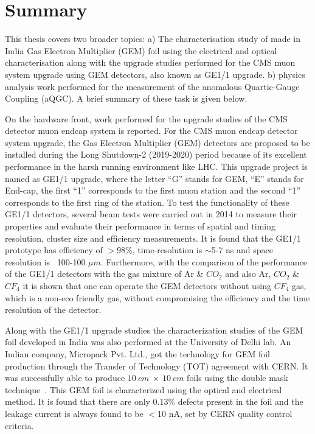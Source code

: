 \chapter{Summary} %
\label{cha:summary_&_outlook}
This thesis covers two broader topics: a) The characterisation study of made in India Gas Electron Multiplier (GEM) foil using the electrical and optical characterisation along with the upgrade studies performed for the CMS muon system upgrade using GEM detectors, also known as GE1/1 upgrade. b) physics analysis work performed for the measurement of the anomalous Quartic-Gauge Coupling (aQGC). A brief summary of these task is given below.

On the hardware front, work performed for the upgrade studies of the CMS detector muon endcap system is reported. For the CMS muon endcap detector system upgrade, the Gas Electron Multiplier (GEM) detectors are proposed to be installed during the Long Shutdown-2 (2019-2020) period because of its excellent performance in the harsh running environment like LHC. This upgrade project is named as GE1/1 upgrade, where the letter ``G'' stands for GEM, ``E'' stands for End-cap, the first ``1'' corresponds to the first muon station and the second ``1'' corresponds to the first ring of the station. To test the functionality of these GE1/1 detectors, several beam tests were carried out in 2014 to measure their properties and evaluate their performance in terms of spatial and timing resolution, cluster size and efficiency measurements. It is found that the GE1/1 prototype has efficiency of $>98\%$, time-resolution is $\sim$5-7 ns and space resolution is ~100-100 $\mu m$. Furthermore, with the comparison of the performance of the GE1/1 detectors with the gas mixture of Ar \& $CO_2$ and also Ar, $CO_2$ \& $CF_4$ it is shown that one can operate the GEM detectors without using $CF_4$ gas, which is a non-eco friendly gas, without compromising the efficiency and the time resolution of the detector.

Along with the GE1/1 upgrade studies the characterization studies of the GEM foil developed in India was also performed at the University of Delhi lab. An Indian company, Micropack Pvt. Ltd., got the technology for GEM foil production through the Transfer of Technology (TOT) agreement with CERN. It was successfully able to produce $10~cm~\times~10~cm$ foils using the double mask technique~\cite{DEOLIVEIRA2009}. This GEM foil is characterized using the optical and electrical method. It is found that there are only 0.13\% defects present in the foil and the leakage current is always found to be $<$10 nA, set by CERN quality control criteria.

